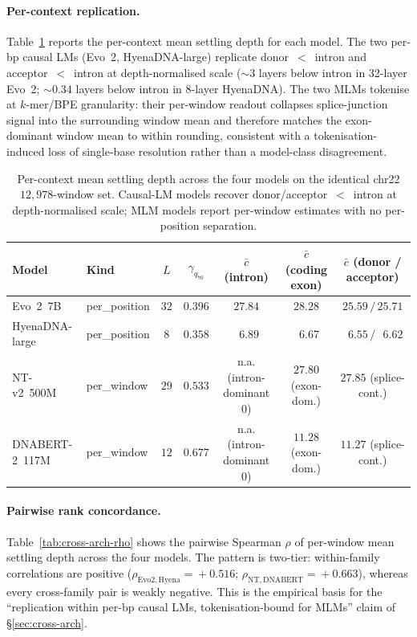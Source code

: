 \documentclass{article}
\theoremstyle{plain}
\theoremstyle{definition}
\theoremstyle{remark}
\begin{document}
\paragraph{Per-context replication.} Table~\ref{tab:cross-arch-context}
reports the per-context mean settling depth for each model. The two
per-bp causal LMs (Evo~2, HyenaDNA-large) replicate
donor~$<$~intron and acceptor~$<$~intron at depth-normalised scale
($\sim 3$ layers below intron in 32-layer Evo~2; $\sim 0.34$ layers below
intron in 8-layer HyenaDNA). The two MLMs tokenise at $k$-mer/BPE
granularity: their per-window readout collapses splice-junction signal
into the surrounding window mean and therefore matches the exon-dominant
window mean to within rounding, consistent with a tokenisation-induced
loss of single-base resolution rather than a model-class disagreement.

\begin{table}[!htbp]
\caption{Per-context mean settling depth across the four models on the
identical chr22 $12{,}978$-window set. Causal-LM models recover
donor/acceptor~$<$~intron at depth-normalised scale; MLM models
report per-window estimates with no per-position separation.}
\label{tab:cross-arch-context}
\centering
\footnotesize
\setlength{\tabcolsep}{4pt}
\begin{tabular}{@{}llccccc@{}}
\toprule
Model & Kind & $L$ & $\gamma_{q_{70}}$
   & $\bar c$ (intron) & $\bar c$ (coding exon)
   & $\bar c$ (donor / acceptor) \\
\midrule
Evo~2~7B            & per\_position & $32$ & $0.396$
   & $27.84$ & $28.28$ & $25.59 \,/\, 25.71$ \\
HyenaDNA-large      & per\_position & $8$  & $0.358$
   & $\phantom{0}6.89$ & $\phantom{0}6.67$
   & $\phantom{0}6.55 \,/\, \phantom{0}6.62$ \\
NT-v2~500M          & per\_window   & $29$ & $0.533$
   & n.a. (intron-dominant 0)
   & $27.80$ (exon-dom.) & $27.85$ (splice-cont.) \\
DNABERT-2~117M      & per\_window   & $12$ & $0.677$
   & n.a. (intron-dominant 0)
   & $11.28$ (exon-dom.) & $11.27$ (splice-cont.) \\
\bottomrule
\end{tabular}
\end{table}

\paragraph{Pairwise rank concordance.} Table~\ref{tab:cross-arch-rho}
shows the pairwise Spearman $\rho$ of per-window mean settling depth
across the four models. The pattern is two-tier: within-family
correlations are positive ($\rho_{\mathrm{Evo2,Hyena}}\!=\!+0.516$;
$\rho_{\mathrm{NT,DNABERT}}\!=\!+0.663$), whereas every cross-family
pair is weakly negative. This is the empirical basis for the
``replication within per-bp causal LMs, tokenisation-bound for MLMs''
claim of \S\ref{sec:cross-arch}.
\end{document}
